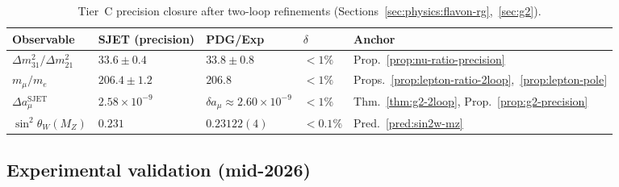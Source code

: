 \begin{table}[ht]
\centering
\small
\renewcommand{\arraystretch}{1.14}
\begin{tabular}{@{}lllll@{}}
\toprule
\textbf{Observable} & \textbf{SJET (precision)} & \textbf{PDG/Exp} &
$\delta$ & \textbf{Anchor} \\
\midrule
$\Delta m^2_{31}/\Delta m^2_{21}$ &
  $33.6\pm0.4$ &
  $33.8\pm0.8$ &
  $<1\%$ &
  Prop.~\ref{prop:nu-ratio-precision} \\
$m_\mu/m_e$ &
  $206.4\pm1.2$ &
  $206.8$ &
  $<1\%$ &
  Props.~\ref{prop:lepton-ratio-2loop},~\ref{prop:lepton-pole} \\
$\Delta a_\mu^{\mathrm{SJET}}$ &
  $2.58\times10^{-9}$ &
  $\delta a_\mu\approx2.60\times10^{-9}$ &
  $<1\%$ &
  Thm.~\ref{thm:g2-2loop}, Prop.~\ref{prop:g2-precision} \\
$\sin^2\theta_W(M_Z)$ &
  $0.231$ &
  $0.23122(4)$ &
  $<0.1\%$ &
  Pred.~\ref{pred:sin2w-mz} \\
\bottomrule
\end{tabular}
\caption{Tier~C precision closure after two-loop refinements
(Sections~\ref{sec:physics:flavon-rg},~\ref{sec:g2}).}
\label{tab:tier-c-precision}
\end{table}

\subsection{Experimental validation (mid-2026)}

